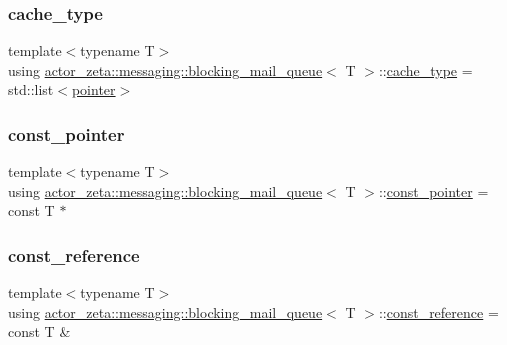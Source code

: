 \subsubsection{\texorpdfstring{cache\+\_\+type}{cache\_type}}
{\footnotesize\ttfamily template$<$typename T$>$ \\
using \hyperlink{classactor__zeta_1_1messaging_1_1blocking__mail__queue}{actor\+\_\+zeta\+::messaging\+::blocking\+\_\+mail\+\_\+queue}$<$ T $>$\+::\hyperlink{classactor__zeta_1_1messaging_1_1blocking__mail__queue_a20156eef06b0a688ceeb663097a90862}{cache\+\_\+type} =  std\+::list$<$\hyperlink{classactor__zeta_1_1messaging_1_1blocking__mail__queue_a64432628c6a91d330431fc3299021045}{pointer}$>$}

\mbox{\label{classactor__zeta_1_1messaging_1_1blocking__mail__queue_a2615c2611ffdb978624dd2eccc75fe57}} 
\subsubsection{\texorpdfstring{const\+\_\+pointer}{const\_pointer}}
{\footnotesize\ttfamily template$<$typename T$>$ \\
using \hyperlink{classactor__zeta_1_1messaging_1_1blocking__mail__queue}{actor\+\_\+zeta\+::messaging\+::blocking\+\_\+mail\+\_\+queue}$<$ T $>$\+::\hyperlink{classactor__zeta_1_1messaging_1_1blocking__mail__queue_a2615c2611ffdb978624dd2eccc75fe57}{const\+\_\+pointer} =  const T $\ast$}

\mbox{\label{classactor__zeta_1_1messaging_1_1blocking__mail__queue_a6a883fe6a6e606317f85156f957f84fd}} 
\subsubsection{\texorpdfstring{const\+\_\+reference}{const\_reference}}
{\footnotesize\ttfamily template$<$typename T$>$ \\
using \hyperlink{classactor__zeta_1_1messaging_1_1blocking__mail__queue}{actor\+\_\+zeta\+::messaging\+::blocking\+\_\+mail\+\_\+queue}$<$ T $>$\+::\hyperlink{classactor__zeta_1_1messaging_1_1blocking__mail__queue_a6a883fe6a6e606317f85156f957f84fd}{const\+\_\+reference} =  const T \&}

